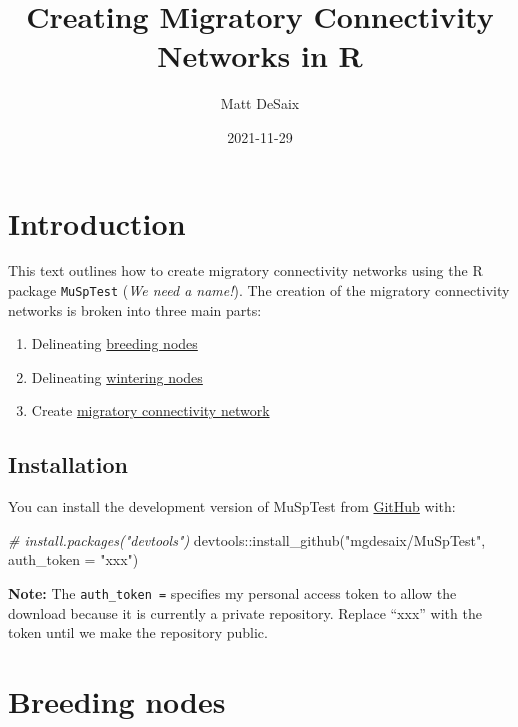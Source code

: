 \documentclass[
]{book}
\title{Creating Migratory Connectivity Networks in R}
\author{Matt DeSaix}
\date{2021-11-29}
\newenvironment{Shaded}{\begin{snugshade}}{\end{snugshade}}
\newcommand{\AttributeTok}[1]{\textcolor[rgb]{0.77,0.63,0.00}{#1}}
\newcommand{\CommentTok}[1]{\textcolor[rgb]{0.56,0.35,0.01}{\textit{#1}}}
\newcommand{\FunctionTok}[1]{\textcolor[rgb]{0.00,0.00,0.00}{#1}}
\newcommand{\NormalTok}[1]{#1}
\newcommand{\SpecialCharTok}[1]{\textcolor[rgb]{0.00,0.00,0.00}{#1}}
\newcommand{\StringTok}[1]{\textcolor[rgb]{0.31,0.60,0.02}{#1}}
\providecommand{\tightlist}{%
  \setlength{\itemsep}{0pt}\setlength{\parskip}{0pt}}
\begin{document}
\maketitle

{
\setcounter{tocdepth}{1}
\tableofcontents
}
\hypertarget{introduction}{%
\chapter{Introduction}\label{introduction}}

This text outlines how to create migratory connectivity networks using the R package \texttt{MuSpTest} (\emph{We need a name!}). The creation of the migratory connectivity networks is broken into three main parts:

\begin{enumerate}
\def\labelenumi{\arabic{enumi}.}
\tightlist
\item
  Delineating \protect\hyperlink{breeding}{breeding nodes}
\item
  Delineating \protect\hyperlink{wintering}{wintering nodes}
\item
  Create \protect\hyperlink{connectivity}{migratory connectivity network}
\end{enumerate}

\hypertarget{installation}{%
\section{Installation}\label{installation}}

You can install the development version of MuSpTest from \href{https://github.com/}{GitHub} with:

\begin{Shaded}
\begin{Highlighting}[]
\CommentTok{\# install.packages("devtools")}
\NormalTok{devtools}\SpecialCharTok{::}\FunctionTok{install\_github}\NormalTok{(}\StringTok{"mgdesaix/MuSpTest"}\NormalTok{, }\AttributeTok{auth\_token =} \StringTok{"xxx"}\NormalTok{)}
\end{Highlighting}
\end{Shaded}

\textbf{Note:} The \texttt{auth\_token\ =} specifies my personal access token to allow the download because it is currently a private repository. Replace ``xxx'' with the token until we make the repository public.

\hypertarget{breeding}{%
\chapter{Breeding nodes}\label{breeding}}
\end{document}
